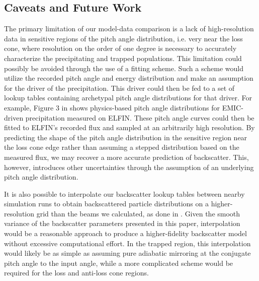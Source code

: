 \documentclass[draft]{agujournal2019}
\begin{document}
\subsection{Caveats and Future Work}
The primary limitation of our model-data comparison is a lack of high-resolution data in sensitive regions of the pitch angle distribution, i.e. very near the loss cone, where resolution on the order of one degree is necessary to accurately characterize the precipitating and trapped populations. This limitation could possibly be avoided through the use of a fitting scheme. Such a scheme would utilize the recorded pitch angle and energy distribution and make an assumption for the driver of the precipitation. This driver could then be fed to a set of lookup tables containing archetypal pitch angle distributions for that driver. For example, Figure 3 in  shows physics-based pitch angle distributions for EMIC-driven precipitation measured on ELFIN. These pitch angle curves could then be fitted to ELFIN's recorded flux and sampled at an arbitrarily high resolution. By predicting the shape of the pitch angle distribution in the sensitive region near the loss cone edge rather than assuming a stepped distribution based on the measured flux, we may recover a more accurate prediction of backscatter. This, however, introduces other uncertainties through the assumption of an underlying pitch angle distribution.

It is also possible to interpolate our backscatter lookup tables between nearby simulation runs to obtain backscattered particle distributions on a higher-resolution grid than the beams we calculated, as done in . Given the smooth variance of the backscatter parameters presented in this paper, interpolation would be a reasonable approach to produce a higher-fidelity backscatter model without excessive computational effort. In the trapped region, this interpolation would likely be as simple as assuming pure adiabatic mirroring at the conjugate pitch angle to the input angle, while a more complicated scheme would be required for the loss and anti-loss cone regions.

%
%
\end{document}
